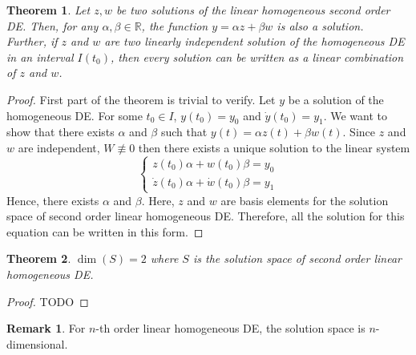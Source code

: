 \documentclass[12pt,reqno]{amsart}
\theoremstyle{plain}
\newtheorem{thm}{Theorem}
\theoremstyle{definition}
\newtheorem{rem}{Remark}
\newcommand{\R}{\mathbb{R}}
\begin{document}
\begin{thm}
    Let $z,w$ be two solutions of the linear homogeneous second order DE. Then, for any $\alpha, \beta \in \R$, the function $y = \alpha z + \beta w$ is also a solution.\\ Further, if $z$ and $w$ are two linearly independent solution of the homogeneous DE in an interval $I(t_0)$, then every solution can be written as a linear combination of $z$ and $w$.
\end{thm}
\begin{proof}
    First part of the theorem is trivial to verify. Let $y$ be a solution of the homogeneous DE. For some $t_0 \in I$, $y(t_0) = y_0 $ and $\dot{y}(t_0) = y_1$. We want to show that there exists $\alpha$ and $\beta$ such that $y(t) = \alpha z(t) + \beta w (t)$. Since $z$ and $w$ are independent, $W \not\equiv 0$ then there exists a unique solution to the linear system
    $$ \left\{
    \begin{array}{l}
        z(t_0)\alpha + w(t_0)\beta = y_0 \\
        \dot{z}(t_0) \alpha + \dot{w}(t_0) \beta = y_1
    \end{array}
    \right.
    $$
    Hence, there exists $\alpha $ and $\beta$. Here, $z$ and $w$ are basis elements for the solution space of second order linear homogeneous DE. Therefore, all the solution for this equation can be written in this form.
\end{proof}
\begin{thm}
    $\dim(S) = 2$ where $S$ is the solution space of second order linear homogeneous DE.
\end{thm}
\begin{proof}
    TODO
\end{proof}
\begin{rem}
    For $n$-th order linear homogeneous DE, the solution space is $n$-dimensional.
\end{rem}
\end{document}
